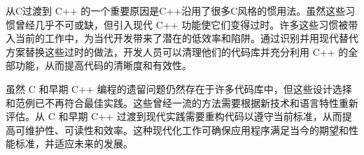 从C过渡到 C++ 的一个重要原因是C++沿用了很多C风格的惯用法。虽然这些习惯曾经几乎不可或缺，但引入现代 C++ 功能使它们变得过时。许多这些习惯被带入当前的工作中，为当代开发带来了潜在的低效率和陷阱。通过识别并用现代替代方案替换这些过时的做法，开发人员可以清理他们的代码库并充分利用 C++ 的全部功能，从而提高代码的清晰度和有效性。

虽然 C 和早期 C++ 编程的遗留问题仍然存在于许多代码库中，但这些设计选择和范例已不再符合最佳实践。这些曾经一流的方法需要根据新技术和语言特性重新评估。从 C 和早期 C++ 过渡到现代实践需要重构代码以遵守当前标准，从而提高可维护性、可读性和效率。这种现代化工作可确保应用程序满足当今的期望和性能标准，并适应未来的发展。
